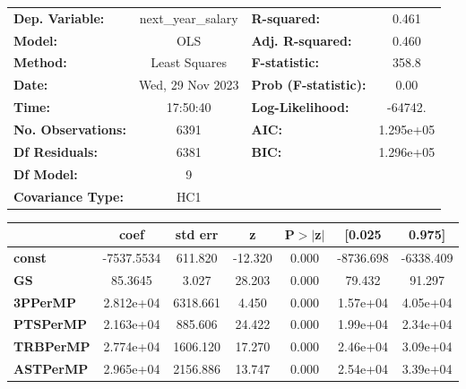 \begin{center}
\begin{tabular}{lclc}
\toprule
\textbf{Dep. Variable:}    & next\_year\_salary & \textbf{  R-squared:         } &     0.461   \\
\textbf{Model:}            &        OLS         & \textbf{  Adj. R-squared:    } &     0.460   \\
\textbf{Method:}           &   Least Squares    & \textbf{  F-statistic:       } &     358.8   \\
\textbf{Date:}             &  Wed, 29 Nov 2023  & \textbf{  Prob (F-statistic):} &     0.00    \\
\textbf{Time:}             &      17:50:40      & \textbf{  Log-Likelihood:    } &   -64742.   \\
\textbf{No. Observations:} &         6391       & \textbf{  AIC:               } & 1.295e+05   \\
\textbf{Df Residuals:}     &         6381       & \textbf{  BIC:               } & 1.296e+05   \\
\textbf{Df Model:}         &            9       & \textbf{                     } &             \\
\textbf{Covariance Type:}  &        HC1         & \textbf{                     } &             \\
\bottomrule
\end{tabular}
\begin{tabular}{lcccccc}
                       & \textbf{coef} & \textbf{std err} & \textbf{z} & \textbf{P$> |$z$|$} & \textbf{[0.025} & \textbf{0.975]}  \\
\midrule
\textbf{const}         &   -7537.5534  &      611.820     &   -12.320  &         0.000        &    -8736.698    &    -6338.409     \\
\textbf{GS}            &      85.3645  &        3.027     &    28.203  &         0.000        &       79.432    &       91.297     \\
\textbf{3PPerMP}       &    2.812e+04  &     6318.661     &     4.450  &         0.000        &     1.57e+04    &     4.05e+04     \\
\textbf{PTSPerMP}      &    2.163e+04  &      885.606     &    24.422  &         0.000        &     1.99e+04    &     2.34e+04     \\
\textbf{TRBPerMP}      &    2.774e+04  &     1606.120     &    17.270  &         0.000        &     2.46e+04    &     3.09e+04     \\
\textbf{ASTPerMP}      &    2.965e+04  &     2156.886     &    13.747  &         0.000        &     2.54e+04    &     3.39e+04     \\

\end{tabular}
\end{center}
